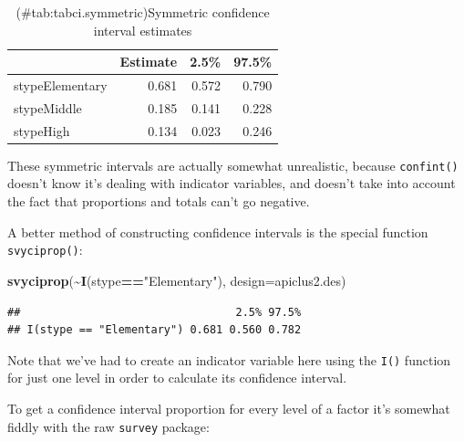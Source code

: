 \documentclass[
]{book}
\newenvironment{Shaded}{\begin{snugshade}}{\end{snugshade}}
\newcommand{\AttributeTok}[1]{\textcolor[rgb]{0.13,0.29,0.53}{#1}}
\newcommand{\FunctionTok}[1]{\textcolor[rgb]{0.13,0.29,0.53}{\textbf{#1}}}
\newcommand{\NormalTok}[1]{#1}
\newcommand{\SpecialCharTok}[1]{\textcolor[rgb]{0.81,0.36,0.00}{\textbf{#1}}}
\newcommand{\StringTok}[1]{\textcolor[rgb]{0.31,0.60,0.02}{#1}}
\begin{document}
\begin{table}
\centering
\caption{(\#tab:tabci.symmetric)Symmetric confidence interval estimates}
\centering
\begin{tabular}[t]{l|r|r|r}
\hline
  & Estimate & 2.5\% & 97.5\%\\
\hline
stypeElementary & 0.681 & 0.572 & 0.790\\
\hline
stypeMiddle & 0.185 & 0.141 & 0.228\\
\hline
stypeHigh & 0.134 & 0.023 & 0.246\\
\hline
\end{tabular}
\end{table}

These symmetric intervals are actually somewhat unrealistic, because
\texttt{confint()} doesn't know it's dealing with indicator variables, and
doesn't take into account the fact that proportions and totals can't go
negative.

A better method of constructing confidence intervals is the special
function \texttt{svyciprop()}:

\begin{Shaded}
\begin{Highlighting}[]
\FunctionTok{svyciprop}\NormalTok{(}\SpecialCharTok{\textasciitilde{}}\FunctionTok{I}\NormalTok{(stype}\SpecialCharTok{==}\StringTok{"Elementary"}\NormalTok{), }\AttributeTok{design=}\NormalTok{apiclus2.des)}
\end{Highlighting}
\end{Shaded}

\begin{verbatim}
##                                 2.5% 97.5%
## I(stype == "Elementary") 0.681 0.560 0.782
\end{verbatim}

Note that we've had to create an indicator variable here using the \texttt{I()}
function for just one level in order to calculate its confidence interval.

To get a confidence interval proportion for every level of a factor
it's somewhat fiddly with the raw \texttt{survey} package:
\end{document}
